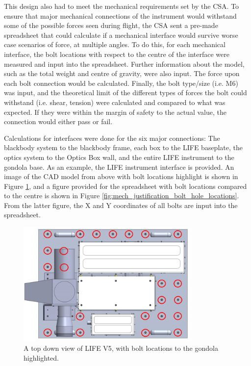 This design also had to meet the mechanical requirements set by the CSA. To ensure that major mechanical connections of the instrument would withstand some of the possible forces seen during flight, the CSA sent a pre-made spreadsheet that could calculate if a mechanical interface would survive worse case scenarios of force, at multiple angles. To do this, for each mechanical interface, the bolt locations with respect to the centre of the interface were measured and input into the spreadsheet. Further information about the model, such as the total weight and centre of gravity, were also input. The force upon each bolt connection would be calculated. Finally, the bolt type/size (i.e. M6) was input, and the theoretical limit of the different types of forces the bolt could withstand (i.e. shear, tension) were calculated and compared to what was expected. If they were within the margin of safety to the actual value, the connection would either pass or fail.

Calculations for interfaces were done for the six major connections: The blackbody system to the blackbody frame, each box to the LIFE baseplate, the optics system to the Optics Box wall, and the entire LIFE instrument to the gondola base. As an example, the LIFE instrument interface is provided. An image of the CAD model from above with bolt locations highlight is shown in Figure \ref{fig:LIFE_V5_topdown_for_mech_justification}, and a figure provided for the spreadsheet with bolt locations compared to the centre is shown in Figure \ref{fig:mech_justification_bolt_hole_locations}. From the latter figure, the X and Y coordinates of all bolts are input into the spreadsheet.

\begin{figure}
    \centering
    \includegraphics[width=0.8\textwidth]{chap3_images/CAD_model_img_for_mech_justification.PNG}
    \caption{A top down view of LIFE V5, with bolt locations to the gondola highlighted.}
    \label{fig:LIFE_V5_topdown_for_mech_justification}
\end{figure}

